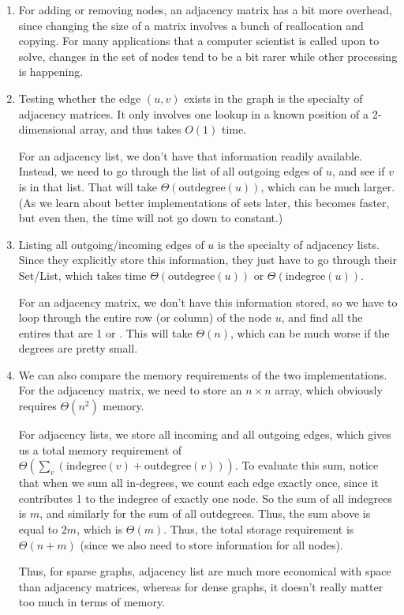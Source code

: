 \begin{enumerate}
\item For adding or removing nodes, an adjacency matrix has a bit more
  overhead, since changing the size of a matrix involves a bunch of
  reallocation and copying. For many applications that a computer
  scientist is called upon to solve, changes in the set of nodes tend
  to be a bit rarer while other processing is happening.

\item Testing whether the edge $(u,v)$ exists in the graph is the
  specialty of adjacency matrices. It only involves one lookup in a
  known position of a 2-dimensional array, and thus takes $O(1)$
  time. 

  For an adjacency list, we don't have that information readily
  available. Instead, we need to go through the list of all outgoing
  edges of $u$, and see if $v$ is in that list. That will take
  $\Theta(\text{outdegree}(u))$, which can be much larger.
  (As we learn about better implementations of sets later, this
  becomes faster, but even then, the time will not go down to constant.)

\item Listing all outgoing/incoming edges of $u$ is the specialty of
  adjacency lists. Since they explicitly store this information, they
  just have to go through their Set/List, which takes time
  $\Theta (\text{outdegree}(u))$ or $\Theta (\text{indegree}(u))$.

  For an adjacency matrix, we don't have this information stored, so
  we have to loop through the entire row (or column) of the node $u$,
  and find all the entires that are 1 or .
  This will take $\Theta(n)$, which can be much worse if the degrees
  are pretty small.

\item We can also compare the memory requirements of the two
  implementations. 
  For the adjacency matrix, we need to store an $n\times n$ array,
  which obviously requires $\Theta(n^2)$ memory.

  For adjacency lists, we store all incoming and all outgoing edges,
  which gives us a total memory requirement of
  $\Theta(\sum_v (\text{indegree}(v) + \text{outdegree}(v)))$.
  To evaluate this sum, notice that when we sum all in-degrees, we
  count each edge exactly once, since it contributes 1 to the indegree
  of exactly one node. So the sum of all indegrees is $m$, and
  similarly for the sum of all outdegrees. Thus, the sum above is
  equal to $2m$, which is $\Theta(m)$.
  Thus, the total storage requirement is $\Theta(n+m)$ (since we also
  need to store information for all nodes).

  Thus, for sparse graphs, adjacency list are much more economical
  with space than adjacency matrices, whereas for dense graphs, it
  doesn't really matter too much in terms of memory.
\end{enumerate}

